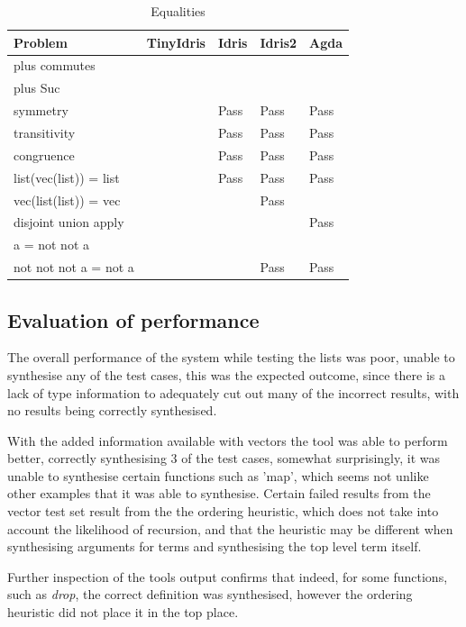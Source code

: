 \documentclass[a4paper]{article}
\begin{document}
\begin{center}
\begin{table}[!htbp]
\begin{tabular}{|l|l|l|l|l|}
\hline
Problem & TinyIdris & Idris & Idris2 & Agda\\
\hline
plus commutes &   &   &   &  \\
plus Suc &   &   &   &  \\
symmetry &   & Pass & Pass & Pass \\
transitivity &   & Pass & Pass & Pass\\
congruence &   & Pass & Pass & Pass\\
list(vec(list)) = list &   & Pass & Pass & Pass\\
vec(list(list)) = vec &   &   & Pass &  \\
disjoint union apply &   &   &   & Pass \\
a = not not a &   &   &   &  \\
not not not a = not a &   &   & Pass & Pass \\
\hline
\end{tabular}
\caption{Equalities}
\end{table}

\end{center}

\subsection{Evaluation of performance}
\label{sec:org4c9aa94}
The overall performance of the system while testing 
the lists was poor, unable to synthesise any of the 
test cases, this was the expected outcome, since
there is a lack of type information to adequately cut out 
many of the incorrect results, with no results being correctly 
synthesised. 

With the added information available with vectors the tool was 
able to perform better, correctly synthesising 3 of the test cases,
somewhat surprisingly, it was unable to synthesise certain functions
such as 'map', which seems not unlike other examples that it was able 
to synthesise. Certain failed results from the vector test set result
from the the ordering heuristic, which does not take into account the
likelihood of recursion, and that the heuristic may be different
when synthesising arguments for terms and synthesising the top level
term itself.

Further inspection of the tools output confirms that indeed, for some
functions, such as \textit{drop}, the correct definition was
synthesised, however the ordering heuristic did not place it in the
top place. 
\end{document}
